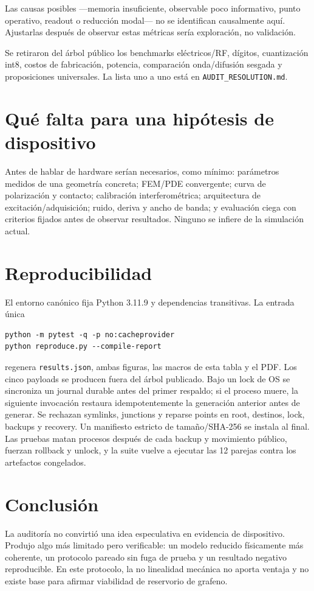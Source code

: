 \documentclass[11pt,a4paper]{article}
\begin{document}
Las causas posibles ---memoria insuficiente, observable poco informativo, punto operativo, readout o reducción modal--- no se identifican causalmente aquí. Ajustarlas después de observar estas métricas sería exploración, no validación.

Se retiraron del árbol público los benchmarks eléctricos/RF, dígitos, cuantización int8, costos de fabricación, potencia, comparación onda/difusión sesgada y proposiciones universales. La lista uno a uno está en \texttt{AUDIT\_RESOLUTION.md}.

\section{Qué falta para una hipótesis de dispositivo}
Antes de hablar de hardware serían necesarios, como mínimo: parámetros medidos de una geometría concreta; FEM/PDE convergente; curva de polarización y contacto; calibración interferométrica; arquitectura de excitación/adquisición; ruido, deriva y ancho de banda; y evaluación ciega con criterios fijados antes de observar resultados. Ninguno se infiere de la simulación actual.

\section{Reproducibilidad}
El entorno canónico fija Python 3.11.9 y dependencias transitivas. La entrada única
\begin{verbatim}
python -m pytest -q -p no:cacheprovider
python reproduce.py --compile-report
\end{verbatim}
regenera \texttt{results.json}, ambas figuras, las macros de esta tabla y el PDF. Los cinco payloads se producen fuera del árbol publicado. Bajo un lock de OS se sincroniza un journal durable antes del primer respaldo; si el proceso muere, la siguiente invocación restaura idempotentemente la generación anterior antes de generar. Se rechazan symlinks, junctions y reparse points en root, destinos, lock, backups y recovery. Un manifiesto estricto de tamaño/SHA-256 se instala al final. Las pruebas matan procesos después de cada backup y movimiento público, fuerzan rollback y unlock, y la suite vuelve a ejecutar las 12 parejas contra los artefactos congelados.

\section{Conclusión}
La auditoría no convirtió una idea especulativa en evidencia de dispositivo. Produjo algo más limitado pero verificable: un modelo reducido físicamente más coherente, un protocolo pareado sin fuga de prueba y un resultado negativo reproducible. En este protocolo, la no linealidad mecánica no aporta ventaja y no existe base para afirmar viabilidad de reservorio de grafeno.
\end{document}
